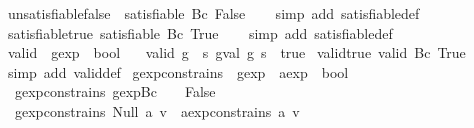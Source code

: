 \begin{isabellebody}
\isanewline
{}\isamarkupfalse%
\ unsatisfiable{\isacharunderscore}false{\isacharcolon}\ {\isachardoublequoteopen}{\isasymnot}\ satisfiable\ {\isacharparenleft}Bc\ False{\isacharparenright}{\isachardoublequoteclose}\isanewline
%
\isadelimproof
\ \ %
\endisadelimproof
%
\isatagproof
{}\isamarkupfalse%
\ {\isacharparenleft}simp\ add{\isacharcolon}\ satisfiable{\isacharunderscore}def{\isacharparenright}%
\endisatagproof
{\isafoldproof}%
%
\isadelimproof
\isanewline
%
\endisadelimproof
\isanewline
{}\isamarkupfalse%
\ satisfiable{\isacharunderscore}true{\isacharcolon}\ {\isachardoublequoteopen}satisfiable\ {\isacharparenleft}Bc\ True{\isacharparenright}{\isachardoublequoteclose}\isanewline
%
\isadelimproof
\ \ %
\endisadelimproof
%
\isatagproof
{}\isamarkupfalse%
\ {\isacharparenleft}simp\ add{\isacharcolon}\ satisfiable{\isacharunderscore}def{\isacharparenright}%
\endisatagproof
{\isafoldproof}%
%
\isadelimproof
\isanewline
%
\endisadelimproof
\isanewline
{}\isamarkupfalse%
\ valid\ {\isacharcolon}{\isacharcolon}\ {\isachardoublequoteopen}gexp\ {\isasymRightarrow}\ bool{\isachardoublequoteclose}\ \isanewline
\ \ {\isachardoublequoteopen}valid\ g\ {\isasymequiv}\ {\isacharparenleft}{\isasymforall}s{\isachardot}\ gval\ g\ s\ {\isacharequal}\ true{\isacharparenright}{\isachardoublequoteclose}\isanewline
\isanewline
{}\isamarkupfalse%
\ valid{\isacharunderscore}true{\isacharcolon}\ {\isachardoublequoteopen}valid\ {\isacharparenleft}Bc\ True{\isacharparenright}{\isachardoublequoteclose}\isanewline
%
\isadelimproof
\ \ %
\endisadelimproof
%
\isatagproof
{}\isamarkupfalse%
\ {\isacharparenleft}simp\ add{\isacharcolon}\ valid{\isacharunderscore}def{\isacharparenright}%
\endisatagproof
{\isafoldproof}%
%
\isadelimproof
\isanewline
%
\endisadelimproof
\isanewline
{}\isamarkupfalse%
\ gexp{\isacharunderscore}constrains\ {\isacharcolon}{\isacharcolon}\ {\isachardoublequoteopen}gexp\ {\isasymRightarrow}\ aexp\ {\isasymRightarrow}\ bool{\isachardoublequoteclose}\ \isanewline
\ \ {\isachardoublequoteopen}gexp{\isacharunderscore}constrains\ {\isacharparenleft}gexp{\isachardot}Bc\ {\isacharunderscore}{\isacharparenright}\ {\isacharunderscore}\ {\isacharequal}\ False{\isachardoublequoteclose}\ {\isacharbar}\isanewline
\ \ {\isachardoublequoteopen}gexp{\isacharunderscore}constrains\ {\isacharparenleft}Null\ a{\isacharparenright}\ v\ {\isacharequal}\ aexp{\isacharunderscore}constrains\ a\ v{\isachardoublequoteclose}\ {\isacharbar}\isanewline

\end{isabellebody}
